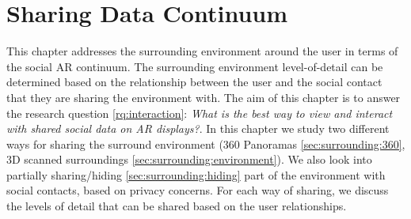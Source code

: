 \chapter{Sharing Data Continuum} %
\label{ch:data} %

This chapter addresses the surrounding environment around the user in terms of the social AR continuum. The surrounding environment level-of-detail can be determined based on the relationship between the user and the social contact that they are sharing the environment with.  The aim of this chapter is to answer the research question \ref{rq:interaction}: \textit{What is the best way to view and interact with shared social data on AR displays?}. In this chapter we study two different ways for sharing the surround environment (360 Panoramas \ref{sec:surrounding:360}, 3D scanned surroundings \ref{sec:surrounding:environment}). We also look into partially sharing/hiding \ref{sec:surrounding:hiding} part of the environment with social contacts, based on privacy concerns. For each way of sharing, we discuss the levels of detail that can be shared based on the user relationships. 





